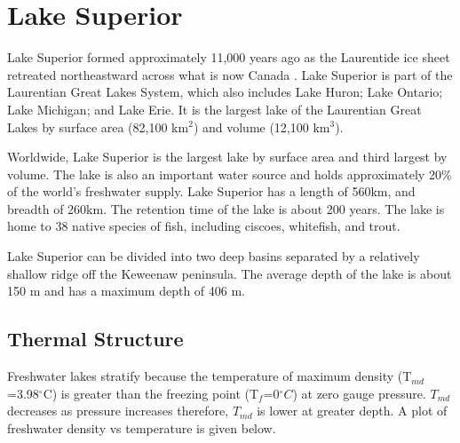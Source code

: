 

\section{Lake Superior}

Lake Superior formed approximately 11,000 years ago as the Laurentide ice 
sheet retreated northeastward across what is now Canada \citep{thomas_etal_1978}. Lake Superior is part 
of the Laurentian Great Lakes System, which also includes Lake Huron; Lake Ontario;
Lake Michigan; and Lake Erie. It is the largest lake of the Laurentian Great Lakes by surface area 
(82,100 km$^2$) and volume (12,100 km$^3$). 

Worldwide, Lake Superior is the largest lake by surface area and third largest by volume. The
lake is also an important water source and holds approximately 20\% of the world's freshwater supply. 
Lake Superior has a length of 560km, and breadth of 260km. The retention time of the lake is about 
200 years. The lake is home to 38 native species of fish, including ciscoes, whitefish, and trout. 

Lake Superior can be divided into two deep basins separated by a relatively shallow ridge off the Keweenaw peninsula. 
The average depth of the lake is about 150 m and has a maximum depth of 406 m. 




\subsection{Thermal Structure}
Freshwater lakes stratify because the temperature of maximum density (T$_{md}$=3.98$^\circ$C) is greater than the freezing point (T$_{f}$=0$^\circ C$) 
at zero gauge pressure.  $T_{md}$ decreases as pressure increases therefore,  $T_{md}$ is lower at greater depth. A plot of freshwater density vs temperature is given below. 


